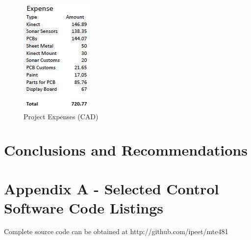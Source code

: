 \documentclass[oneside,final,a4paper]{report}
\begin{document}
\begin{figure}[hbt]
 \centering
 \includegraphics[scale=1]{Project_Expenses}
 \caption{Project Expenses (CAD)}
 \label{fig:costs}
\end{figure}


\chapter{Conclusions and Recommendations}

\renewcommand{\thesection}{\Alph{chapter}.\arabic{section}}

\chapter*{Appendix A - Selected Control Software Code Listings}
\setcounter{chapter}{1}
Complete source code can be obtained at http://github.com/ipeet/mte481
\end{document}
